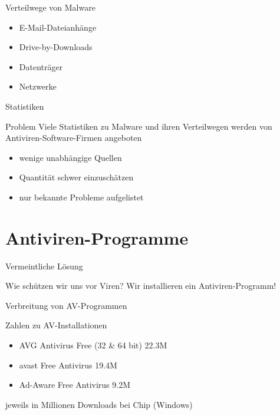 \documentclass{beamer}
\begin{document}
	\begin{frame}{Verteilwege von Malware}
		\begin{itemize}
			\item E-Mail-Dateianhänge
			\item Drive-by-Downloads
			\item Datenträger
			\item Netzwerke
		\end{itemize}
	\end{frame}
	
	\begin{frame}{Statistiken}
		\begin{alertblock}{Problem}
			Viele Statistiken zu Malware und ihren Verteilwegen werden von Antiviren-Software-Firmen angeboten
		\end{alertblock}
		\begin{itemize}
			\item wenige \alert{unabhängige} Quellen
			\item Quantität schwer einzuschätzen
			\item nur bekannte Probleme aufgelistet
		\end{itemize}
	\end{frame}
	
	
	\section{Antiviren-Programme}
	
	\begin{frame}{Vermeintliche Lösung}
		\begin{alertblock}{Wie schützen wir uns vor Viren?}
			Wir installieren ein Antiviren-Programm!
		\end{alertblock}
	\end{frame}
	
	\begin{frame}{Verbreitung von AV-Programmen}
		\begin{alertblock}{Zahlen zu AV-Installationen}
			\begin{itemize}
				\item{AVG Antivirus Free (32 \& 64 bit) 22.3M}
				\item{avast Free Antivirus 19.4M}
				\item{Ad-Aware Free Antivirus 9.2M}
			\end{itemize}
			jeweils in Millionen Downloads bei Chip (Windows)
		\end{alertblock}
	\end{frame}
\end{document}
